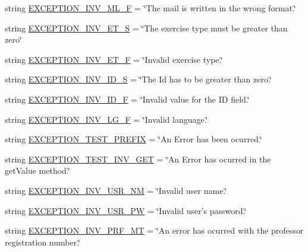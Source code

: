 \begin{DoxyCompactItemize}
string \hyperlink{namespaceELO_1_1lang_1_1en__us_a2fc8746bab16108f7d2d92f47ea76df5}{E\-X\-C\-E\-P\-T\-I\-O\-N\-\_\-\-I\-N\-V\-\_\-\-M\-L\-\_\-\-F} = \char`\"{}The mail is written in the wrong format.\char`\"{}
\item 
string \hyperlink{namespaceELO_1_1lang_1_1en__us_aac1aa53fd2a1bce584dc264dbe9edab0}{E\-X\-C\-E\-P\-T\-I\-O\-N\-\_\-\-I\-N\-V\-\_\-\-E\-T\-\_\-\-S} = \char`\"{}The exercise type must be greater than zero\char`\"{}
\item 
string \hyperlink{namespaceELO_1_1lang_1_1en__us_a48eadceddad856b8c85cebe9c4b079cc}{E\-X\-C\-E\-P\-T\-I\-O\-N\-\_\-\-I\-N\-V\-\_\-\-E\-T\-\_\-\-F} = \char`\"{}Invalid exercise type.\char`\"{}
\item 
string \hyperlink{namespaceELO_1_1lang_1_1en__us_a5969912611777597fe26a73f442c3d40}{E\-X\-C\-E\-P\-T\-I\-O\-N\-\_\-\-I\-N\-V\-\_\-\-I\-D\-\_\-\-S} = \char`\"{}The Id has to be greater than zero.\char`\"{}
\item 
string \hyperlink{namespaceELO_1_1lang_1_1en__us_ada640e51784cf7302312b76f9d379646}{E\-X\-C\-E\-P\-T\-I\-O\-N\-\_\-\-I\-N\-V\-\_\-\-I\-D\-\_\-\-F} = \char`\"{}Invalid value for the I\-D field.\char`\"{}
\item 
string \hyperlink{namespaceELO_1_1lang_1_1en__us_a1b2b1714eb331b222c634a24dc80c154}{E\-X\-C\-E\-P\-T\-I\-O\-N\-\_\-\-I\-N\-V\-\_\-\-L\-G\-\_\-\-F} = \char`\"{}Invalid language.\char`\"{}
\item 
string \hyperlink{namespaceELO_1_1lang_1_1en__us_ae381ed4395112e114c70faaed453321b}{E\-X\-C\-E\-P\-T\-I\-O\-N\-\_\-\-T\-E\-S\-T\-\_\-\-P\-R\-E\-F\-I\-X} = \char`\"{}An Error has been ocurred.\char`\"{}
\item 
string \hyperlink{namespaceELO_1_1lang_1_1en__us_abafb0e06e1be86ba8ccd7b90c9aa59b5}{E\-X\-C\-E\-P\-T\-I\-O\-N\-\_\-\-T\-E\-S\-T\-\_\-\-I\-N\-V\-\_\-\-G\-E\-T} = \char`\"{}An Error has ocurred in the get\-Value method.\char`\"{}
\item 
string \hyperlink{namespaceELO_1_1lang_1_1en__us_a5f856945bd0838a5cd63d9e50056b030}{E\-X\-C\-E\-P\-T\-I\-O\-N\-\_\-\-I\-N\-V\-\_\-\-U\-S\-R\-\_\-\-N\-M} = \char`\"{}Invalid user name.\char`\"{}
\item 
string \hyperlink{namespaceELO_1_1lang_1_1en__us_a03446dd5e8c8c1c24979a47cb7cdbacb}{E\-X\-C\-E\-P\-T\-I\-O\-N\-\_\-\-I\-N\-V\-\_\-\-U\-S\-R\-\_\-\-P\-W} = \char`\"{}Invalid user's password.\char`\"{}
\item 
string \hyperlink{namespaceELO_1_1lang_1_1en__us_aa19d6f0d52aa12a08068efd05d5a64b3}{E\-X\-C\-E\-P\-T\-I\-O\-N\-\_\-\-I\-N\-V\-\_\-\-P\-R\-F\-\_\-\-M\-T} = \char`\"{}An error has ocurred with the professor registration number.\char`\"{}

\end{DoxyCompactItemize}
